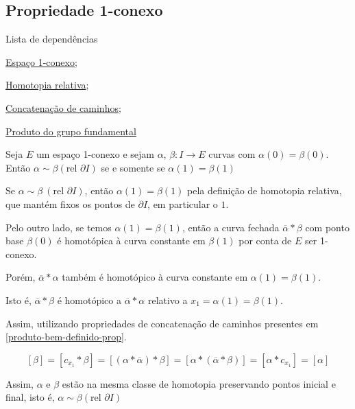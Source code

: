 \subsection{Propriedade 1-conexo} %
\label{1-conexo-prop}
\begin{titlemize}{Lista de dependências}
	\item \hyperref[espaço-1-conexo-def]{Espaço 1-conexo};\\ %
	\item \hyperref[homotopia-relativa-def]{Homotopia relativa};\\
        \item \hyperref[Produto-concatenacao-def]{Concatenação de caminhos};\\
        \item  \hyperref[produto-bem-definido-prop]{Produto do grupo fundamental}
\end{titlemize}




\begin{prop}%
	Seja $E$ um espaço 1-conexo e sejam $\alpha$, $\beta: I\rightarrow E$ curvas com $\alpha(0)=\beta(0)$. Então $\alpha \sim \beta (\text{rel }\partial I)$ se e somente se $\alpha(1)=\beta(1)$\\
\end{prop}
\begin{dem}
    Se $\alpha \sim \beta ~(\text{rel }\partial I)$, então $\alpha(1)=\beta(1)$ pela definição de homotopia relativa, que mantém fixos os pontos de $\partial I$, em particular o $1$.

    Pelo outro lado, se temos $\alpha(1)=\beta(1)$, então a curva fechada $\overline{\alpha}* \beta$ com ponto base $\beta(0)$ é homotópica à curva constante em $\beta(1)$ por conta de $E$ ser 1-conexo.
    
    Porém, $\overline{\alpha}*\alpha$ também é homotópico à curva constante em $\alpha(1)=\beta(1)$. 
    
    Isto é, $\overline{\alpha}* \beta$ é homotópico a $\overline{\alpha}*\alpha$ relativo a $x_1=\alpha(1)=\beta(1)$.

    Assim, utilizando propriedades de concatenação de caminhos presentes em \ref{produto-bem-definido-prop}.

   $$[\beta]=[c_{x_1}*\beta]=[(\alpha * \overline{\alpha}) *\beta]=[\alpha*(\overline{\alpha}*\beta)]=[\alpha * c_{x_1}]=[\alpha]$$

   Assim, $\alpha$ e $\beta$ estão na mesma classe de homotopia preservando pontos inicial e final, isto é, $\alpha \sim \beta (\text{rel }\partial I)$
\end{dem}

